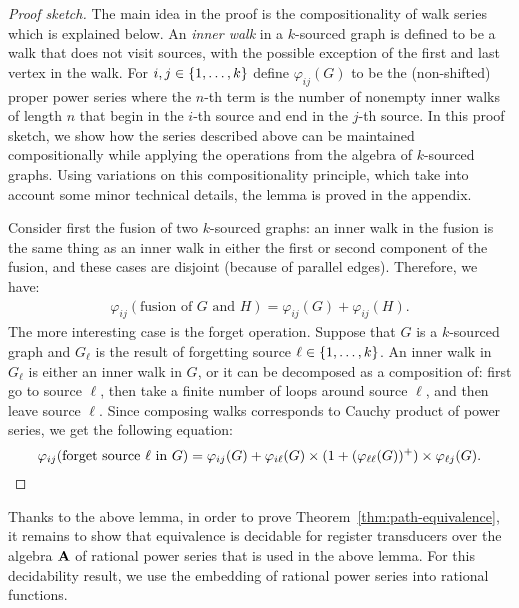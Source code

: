 \begin{proof}[Proof sketch] The main idea in the proof is the compositionality of walk series which is explained below. 
    An \emph{inner walk} in a $k$-sourced graph is defined to be a walk that does not visit sources, with the possible exception of the first and last vertex in the walk.  For $i,j \in \{1,\ldots,k\}$ define  $\varphi_{ij}(G)$ to be the (non-shifted) proper power series where the $n$-th term is the number of nonempty inner walks of length $n$ that begin in the $i$-th source and end in the $j$-th source. In this proof sketch, we show how the series described above can be maintained compositionally
      while applying the operations from the algebra of $k$-sourced graphs. Using variations on this compositionality principle, which take into account some minor technical details, the lemma is proved in the appendix. 
    
      Consider first the fusion of two $k$-sourced graphs: an inner walk in the fusion is the same thing as an inner walk in either the first or second component of the fusion, and these cases are disjoint (because of parallel edges). Therefore, we have:
    \begin{align*}
    \varphi_{ij}(\text{fusion of $G$ and $H$}) =  \varphi_{ij}(G) + \varphi_{ij}(H).
    \end{align*}
    The more interesting case is the forget operation. Suppose that $G$ is a $k$-sourced graph and $G_\ell$ is the result of forgetting source $\ell \in \{1,\ldots,k\}$. An inner walk in $G_\ell$ is either an inner walk in $G$, or it can be decomposed as a composition of: first go to source $\ell$, then take a finite number of loops around source $\ell$, and then leave source $\ell$. Since composing walks corresponds to Cauchy product of power series, we get the  following equation:
    \begin{equation*}%
    \varphi_{ij}(\text{forget source $\ell$ in $G$}) = \varphi_{ij}(G) + \varphi_{i\ell}(G) \times (1 + (\varphi_{\ell \ell}(G))^+) \times \varphi_{\ell j}(G).\qedhere
    \end{equation*}
    \end{proof}
Thanks to the above lemma, in order to prove Theorem~\ref{thm:path-equivalence}, it remains to show that equivalence is decidable for register transducers over the algebra $\mathbf{A}$ of rational power series that is used in the above lemma.  For this decidability result, we use the embedding of rational power series into rational functions. 
